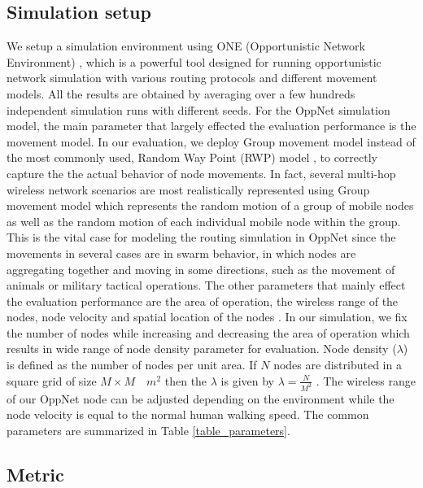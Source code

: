 \documentclass[conference]{IEEEtran}
\begin{document}
\subsection{Simulation setup}
We setup a simulation environment using ONE (Opportunistic Network Environment) \cite{Keranen2009b}, which is a powerful tool designed for running opportunistic network simulation with various routing protocols and different movement models.
All the results are obtained by averaging over a few hundreds independent simulation runs with different seeds.
For the OppNet simulation model, the main parameter that largely effected the evaluation performance is the movement model.
In our evaluation, we deploy Group movement model instead of the most commonly used, Random Way Point (RWP) model \cite{Batabyal2012}, to correctly capture the the actual behavior of node movements.
In fact, several multi-hop wireless network scenarios are most realistically represented using Group movement model \cite{Blakely2004} which represents the random motion of a group of mobile nodes as well as the random motion of each individual mobile node within the group.
This is the vital case for modeling the routing simulation in OppNet since the movements in several cases are in swarm behavior, in which nodes are aggregating together and moving in some directions, such as the movement of animals or military tactical operations.
The other parameters that mainly effect the evaluation performance are the area of operation, the wireless range of the nodes, node velocity and spatial location of the nodes \cite{Batabyal2012}. 
In our simulation, we fix the number of nodes while increasing and decreasing the area of operation which results in wide range of node density parameter for evaluation.
Node density ($\lambda$) is defined as the number of nodes per unit area. 
If $N$ nodes are distributed in a square grid of size $M \times M \quad{ m }^{ 2 }$ then the $\lambda$ is given by $\lambda =\frac { N }{ { M }^{ 2 } } $ . 
The wireless range of our OppNet node can be adjusted depending on the environment while the node velocity is equal to the normal human walking speed.
The common parameters are summarized in Table \ref{table_parameters}.

\subsection{Metric}
\end{document}
